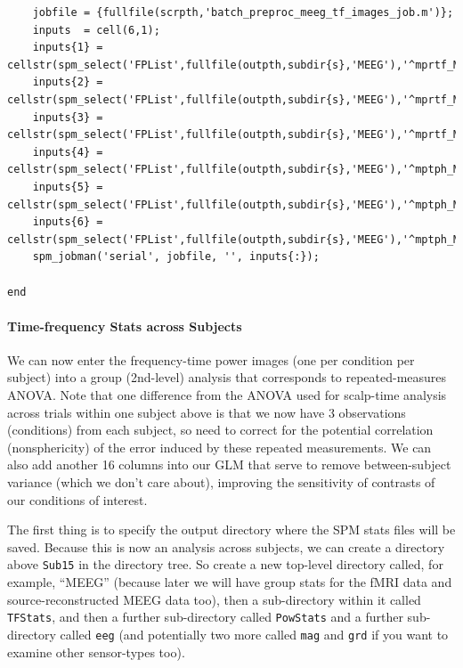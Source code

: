 \begin{lstlisting}[style=Matlab-editor,basicstyle=\mlttfamily\footnotesize]
    %% Write out power and phase images for each modality
    jobfile = {fullfile(scrpth,'batch_preproc_meeg_tf_images_job.m')};
    inputs  = cell(6,1);
    inputs{1} = cellstr(spm_select('FPList',fullfile(outpth,subdir{s},'MEEG'),'^mprtf_Mcbdspmeeg.*\.mat$'));
    inputs{2} = cellstr(spm_select('FPList',fullfile(outpth,subdir{s},'MEEG'),'^mprtf_Mcbdspmeeg.*\.mat$'));
    inputs{3} = cellstr(spm_select('FPList',fullfile(outpth,subdir{s},'MEEG'),'^mprtf_Mcbdspmeeg.*\.mat$'));
    inputs{4} = cellstr(spm_select('FPList',fullfile(outpth,subdir{s},'MEEG'),'^mptph_Mcbdspmeeg.*\.mat$'));
    inputs{5} = cellstr(spm_select('FPList',fullfile(outpth,subdir{s},'MEEG'),'^mptph_Mcbdspmeeg.*\.mat$'));
    inputs{6} = cellstr(spm_select('FPList',fullfile(outpth,subdir{s},'MEEG'),'^mptph_Mcbdspmeeg.*\.mat'));
    spm_jobman('serial', jobfile, '', inputs{:});

end
\end{lstlisting}

\paragraph{Time-frequency Stats across Subjects}

We can now enter the frequency-time power images (one per condition per subject) into a group (2nd-level) analysis that corresponds to repeated-measures ANOVA. Note that one difference from the ANOVA used for scalp-time analysis across trials within one subject above is that we now have 3 observations (conditions) from each subject, so need to correct for the potential correlation (nonsphericity) of the error induced by these repeated measurements. We can also add another 16 columns into our GLM that serve to remove between-subject variance (which we don't care about), improving the sensitivity of contrasts of our conditions of interest.

The first thing is to specify the output directory where the SPM stats files will be saved. Because this is now an analysis across subjects, we can create a directory above \texttt{Sub15} in the directory tree. So create a new top-level directory called, for example, ``MEEG'' (because later we will have group stats for the fMRI data and source-reconstructed MEEG data too), then a sub-directory within it called \texttt{TFStats}, and then a further sub-directory called \texttt{PowStats} and a further sub-directory called \texttt{eeg} (and potentially two more called \texttt{mag} and \texttt{grd} if you want to examine other sensor-types too).

